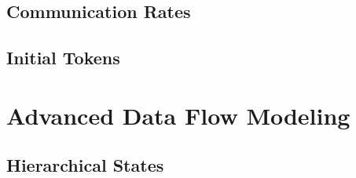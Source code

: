 \subsection{Communication Rates}

\subsection{Initial Tokens}


\section{Advanced Data Flow Modeling}
\subsection{Hierarchical States}


%
%
%
%
%
%
%


